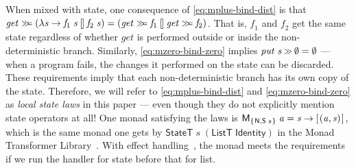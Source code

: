 \documentclass{llncs}
\newcommand{\Conid}[1]{\mathit{#1}}
\newcommand{\Varid}[1]{\mathit{#1}}
\let\Varid\mathit
\let\Conid\mathsf
\begin{document}
When mixed with state, one consequence of \eqref{eq:mplus-bind-dist} is that \ensuremath{\Varid{get}\mathrel{\hstretch{0.7}{>\!\!>\!\!=}}(\lambda \Varid{s}\to \Varid{f}_{1}\;\Varid{s}\mathbin{\talloblong}\Varid{f}_{2}\;\Varid{s})\mathrel{=}(\Varid{get}\mathrel{\hstretch{0.7}{>\!\!>\!\!=}}\Varid{f}_{1}\mathbin{\talloblong}\Varid{get}\mathrel{\hstretch{0.7}{>\!\!>\!\!=}}\Varid{f}_{2})}. That is, \ensuremath{\Varid{f}_{1}} and \ensuremath{\Varid{f}_{2}} get the same state regardless of whether \ensuremath{\Varid{get}} is performed outside or inside the non-deterministic branch.
Similarly, \eqref{eq:mzero-bind-zero} implies \ensuremath{\Varid{put}\;\Varid{s}\mathbin{\hstretch{0.7}{>\!\!>}}\emptyset\mathrel{=}\emptyset} --- when a program fails, the changes it performed on the state can be discarded.
These requirements imply that each non-deterministic branch has its own copy of the state.
Therefore, we will refer to \eqref{eq:mplus-bind-dist} and \eqref{eq:mzero-bind-zero} as \emph{local state laws} in this paper --- even though they do not explicitly mention state operators at all!
One monad satisfying the laws is \ensuremath{\Conid{M}_{\{\mskip1.5mu \Conid{N},\Conid{S}\;\Varid{s}\mskip1.5mu\}}\;\Varid{a}\mathrel{=}\Varid{s}\to [\mskip1.5mu (\Varid{a},\Varid{s})\mskip1.5mu]}, which is the same monad one gets by \ensuremath{\Conid{StateT}\;\Varid{s}\;(\Conid{ListT}\;\Conid{Identity})} in the Monad Transformer Library~\cite{MTL:14}.
With effect handling~\cite{Wu:14:Effect, KiselyovIshii:15:Freer}, the monad meets the requirements if we run the handler for state before that for list.
\end{document}
